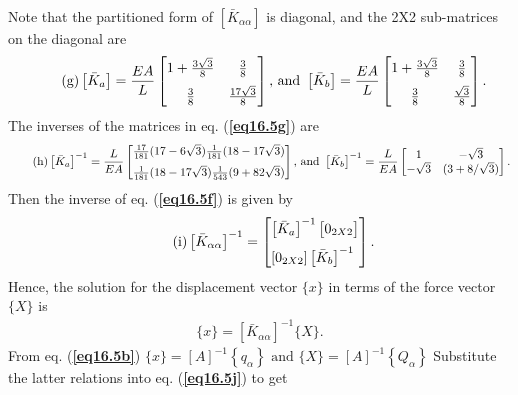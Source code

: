 \documentclass{AeroStructure-ERJohnson}
\begin{document}
\begin{example}
\begin{align}
\end{align}
Note that the partitioned form of $\left[\bar{K}_{\alpha \alpha}\right]$ is diagonal, and the 2X2 sub-matrices on the diagonal are
\begin{align}\label{eq16.5g}\tag{g}
\left[\bar{K}_{a}\right]=\frac{E A}{L}\left[\begin{array}{@{}cc@{}}1+\frac{3 \sqrt{3}}{8} & \frac{3}{8} \\[6pt]\frac{3}{8} & \frac{17 \sqrt{3}}{8}\end{array}\right]\mbox{, and }\left[\bar{K}_{b}\right]=\frac{E A}{L}\left[\begin{array}{@{}cc@{}}1+\frac{3 \sqrt{3}}{8} & \frac{3}{8} \\[6pt]\frac{3}{8} & \frac{\sqrt{3}}{8}\end{array}\right].
\end{align}
The inverses of the matrices in eq. (\textbf{\ref{eq16.5g}}) are
\begin{align}\label{eq16.5h}\tag{h}
\left[\bar{K}_{a}\right]^{-1}=\frac{L}{E A} \left[\begin{array}{@{}l@{}}\frac{17}{181}(17-6 \sqrt{3}) \frac{1}{181}(18-17 \sqrt{3}) \\[6pt]\frac{1}{181}(18-17 \sqrt{3}) \frac{1}{543}(9+82 \sqrt{3})\end{array}\right]\mbox{, and }\left[\bar{K}_{b}\right]^{-1}=\frac{L}{E A}\left[\begin{array}{@{}cc@{}}1 & -\sqrt{3} \\-\sqrt{3} & (3+8 / \sqrt{3})\end{array}\right].
\end{align}
Then the inverse of eq. (\textbf{\ref{eq16.5f}}) is given by
\begin{align}\label{eq16.5i}\tag{i}
\left[\bar{K}_{\alpha \alpha}\right]^{-1}=\left[\begin{array}{@{}l@{}}{\left[\bar{K}_{a}\right]^{-1}\left[\begin{array}{@{}l@{}}0_{2 X 2}\end{array}\right]} \\[6pt]{\left[0_{2 X 2}\right]\left[\bar{K}_{b}\right]^{-1}}\end{array}\right].
\end{align}
Hence, the solution for the displacement vector $\{x\}$ in terms of the force vector $\{X\}$ is
\begin{align}\label{eq16.5j}\tag{j}
\{x\}=\left[\bar{K}_{\alpha \alpha}\right]^{-1}\{X\}.
\end{align}
From eq. (\textbf{\ref{eq16.5b}}) $\{x\}=[A]^{-1}\left\{q_{\alpha}\right\}\mbox{ and }\{X\}=[A]^{-1}\left\{Q_{\alpha}\right\}$ Substitute the latter relations into eq. (\textbf{\ref{eq16.5j}}) to get

\end{example}
\end{document}
